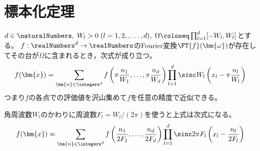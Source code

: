 \chapter{標本化定理}
    \begin{shadebox}
        $d\in\naturalNumbers,\;W_l>0\;(l=1,2,,\dots,d),\;\Omega\coloneq\prod_{l=1}^d [-W_l,W_l]$とする。
        $f:\realNumbers^d\to\realNumbers$のFourier変換$\FT{f}(\bm{\omega})$が存在してその台が$\Omega$に含まれるとき，次式が成り立つ。
        \[ f(\bm{x}) = \sum_{\bm{n}\in\integers^d}f\left(\pi\frac{n_1}{W_1},\dots,\pi\frac{n_d}{W_d}\right)\prod_{l=1}^d\sinc W_l\left(x_l - \pi\frac{n_l}{W_l}\right) \]
        つまり$f$の各点での評価値を沢山集めて$f$を任意の精度で近似できる。
        \par
        角周波数$W_l$のかわりに周波数$F_l=W_l/(2\pi)$を使うと上式は次式になる。
        \[ f(\bm{x}) = \sum_{\bm{n}\in\integers^d}f\left(\frac{n_1}{2F_1},\dots,\frac{n_d}{2F_d}\right)\prod_{l=1}^d\sinc 2\pi F_l\left(x_l - \frac{n_l}{2F_l}\right) \]
    \end{shadebox}
